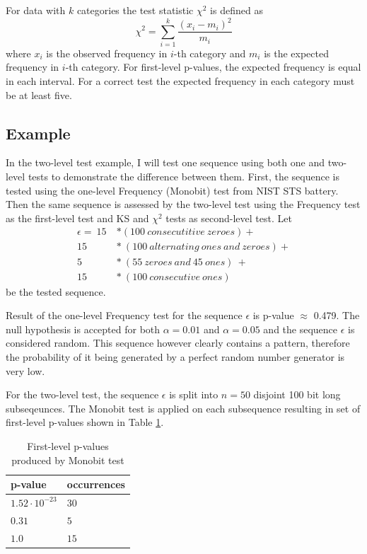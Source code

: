 \documentclass[
  digital,     %
  oneside,     %
  nosansbold,  %
  nocolorbold, %
  nolof,         %
  nolot,         %
]{fithesis4}
\begin{document}
For data with $k$ categories the test statistic $\chi^2$ is defined as \[\chi^2 = \sum_{i=1}^{k} \dfrac{(x_i - m_i)^2}{m_i} \]
where $x_i$ is the observed frequency in $i$-th category and $m_i$ is the expected frequency in $i$-th category. For first-level p-values, the expected frequency is equal in each interval. For a correct test the expected frequency in each category must be at least five. \cite[p. 171]{stat-procedures}

\subsection{Example}

In the two-level test example, I will test one sequence using both one and two-level tests to demonstrate the difference between them. First, the sequence is tested using the one-level Frequency (Monobit) test from NIST STS battery.\cite[p. 2-2]{nist_special} Then the same sequence is assessed by the two-level test using the Frequency test as the first-level test and KS and $\chi^2$ tests as second-level test. Let
\[\begin{split}
    \epsilon =\:15\: &* (100\:consecutitive\:zeroes) + \\
    15\:&*\:(100\:alternating\:ones\:and\:zeroes) + \\
    5\:&*\:(55\:zeroes\:and\:45\:ones)\:+\:\\
    15\:&*\:(100\:consecutive\:ones)
\end{split}\]
be the tested sequence. 

Result of the one-level Frequency test for the sequence $\epsilon$ is p-value $\approx$ 0.479. The null hypothesis is accepted for both $\alpha = 0.01$ and $\alpha = 0.05$ and the sequence $\epsilon$ is considered random. This sequence however clearly contains a pattern, therefore the probability of it being generated by a perfect random number generator is very low.

For the two-level test, the sequence $\epsilon$ is split into $n=50$  disjoint 100 bit long subseqeunces. The Monobit test is applied on each subsequence resulting in set of first-level p-values shown in Table \ref{tab:first_pvalues}.

\begin{table}[h]
  \begin{tabularx}{0.4\textwidth}{ll}
    \toprule
    p-value & occurrences  \\
    \midrule
    $1.52 \cdot 10^{-23}$ & $30$\\
    $0.31$ & $5$\\
    $1.0$ & $15$\\
    \bottomrule
  \end{tabularx}
  \caption{First-level p-values produced by Monobit test}
  \label{tab:first_pvalues}
\end{table}
\end{document}
